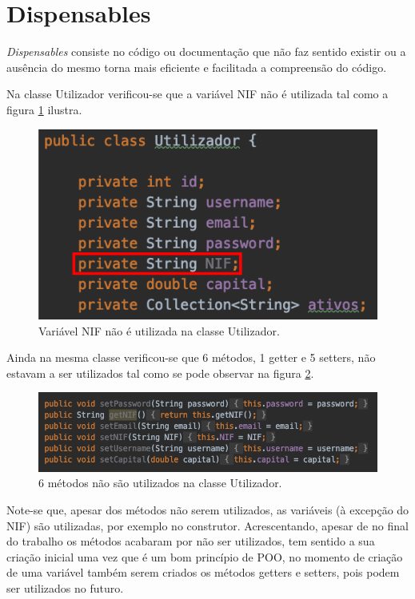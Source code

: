 \newpage
\section{Dispensables}

\hspace{5mm} \emph{Dispensables} consiste no código ou documentação que não faz sentido existir ou a ausência do mesmo torna mais eficiente e facilitada a compreensão do código.

\hspace{5mm} Na classe Utilizador verificou-se que a variável NIF não é utilizada tal como a figura \ref{img:pag5} ilustra.

\begin{figure}[H]
	\centering
	\includegraphics[scale=0.55]{images/dispensable_1.png}
	\caption{Variável NIF não é utilizada na classe Utilizador.}
	\label{img:pag5}
\end{figure}

\hspace{5mm} Ainda na mesma classe verificou-se que 6 métodos, 1 getter e 5 setters, não estavam a ser utilizados tal como se pode observar na figura \ref{img:pag6}.

\begin{figure}[H]
	\centering
	\includegraphics[scale=0.55]{images/dispensable_2.png}
	\caption{6 métodos não são utilizados na classe Utilizador.}
	\label{img:pag6}
\end{figure}

\hspace{5mm} Note-se que, apesar dos métodos não serem utilizados, as variáveis (à excepção do NIF) são utilizadas, por exemplo no construtor. Acrescentando, apesar de no final do trabalho os métodos acabaram por não ser utilizados, tem sentido a sua criação inicial uma vez que é um bom princípio de POO, no momento de criação de uma variável também serem criados os métodos getters e setters, pois podem ser utilizados no futuro.

